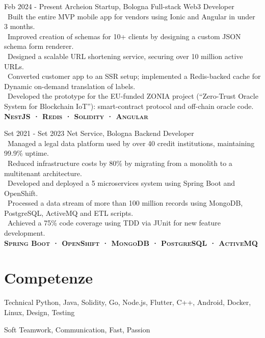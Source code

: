 \documentclass{tccv}
\begin{document}
\begin{eventlist}

     \item{Feb 2024 - Present}
     {Archeion Startup, Bologna}
     {Full-stack Web3 Developer} \\
     \textbullet~Built the entire MVP mobile app for vendors using Ionic and Angular in under 3 months. \\
     \textbullet~Improved creation of schemas for 10+ clients by designing a custom JSON schema form renderer. \\
     \textbullet~Designed a scalable URL shortening service, securing over 10 million active URLs. \\
     \textbullet~Converted customer app to an SSR setup; implemented a Redis-backed cache for Dynamic on-demand translation of labels. \\
     \textbullet~Developed the prototype for the EU-funded ZONIA project (“Zero-Trust Oracle System for Blockchain IoT”): smart-contract protocol and off-chain oracle code. \\
     \textbf{\textsc{NestJS · Redis · Solidity · Angular}}

     \item{Set 2021 - Set 2023}
     {Net Service, Bologna}
     {Backend Developer} \\
     \textbullet~Managed a legal data platform used by over 40 credit institutions, maintaining 99.9\% uptime. \\
     \textbullet~Reduced infrastructure costs by 80\% by migrating from a monolith to a multitenant architecture. \\
     \textbullet~Developed and deployed a 5 microservices system using Spring Boot and OpenShift. \\
     \textbullet~Processed a data stream of more than 100 million records using MongoDB, PostgreSQL, ActiveMQ and ETL scripts. \\
     \textbullet~Achieved a 75\% code coverage using TDD via JUnit for new feature development. \\
     \textbf{\textsc{Spring Boot · OpenShift · MongoDB · PostgreSQL · ActiveMQ}}

\end{eventlist}

\section{Competenze}

\begin{factlist}

\item{Technical}
     {Python, Java, Solidity, Go, Node.js, Flutter, C++, Android, Docker, Linux, Design, Testing} \\

\item{Soft}
     {Teamwork, Communication, Fast, Passion}

\end{factlist}
\end{document}
